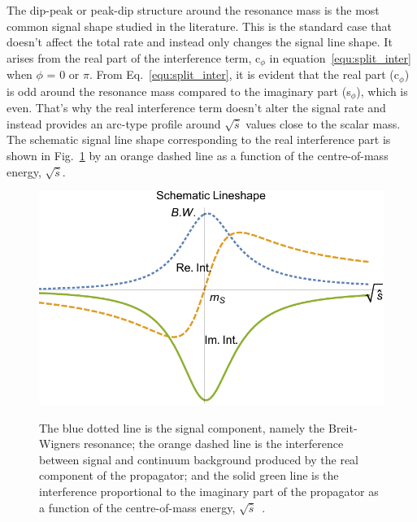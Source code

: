 The dip-peak or peak-dip structure around the resonance mass is the most common signal shape studied in the literature. This is the standard case that doesn't affect the total rate and instead only changes the signal line shape. It arises from the real part of the interference term, c$_{\phi}$ in equation~\ref{equ:split_inter} when $\phi$ = 0 or $\pi$. From Eq.~\ref{equ:split_inter}, it is evident that the real part (c$_{\phi}$) is odd around the resonance mass compared to the imaginary part (s$_{\phi}$), which is even. That's why the real interference term doesn't alter the signal rate and instead provides an arc-type profile around $\sqrt{\hat{s}}$ values close to the scalar mass. The schematic signal line shape corresponding to the real interference part is shown in Fig.~\ref{fig:schematic_lineshape} by an orange dashed line as a function of the centre-of-mass energy, $\sqrt{\hat{s}}$.  
\begin{figure}[htp]
\centering
\includegraphics[trim={0cm 0.0cm 0 0.5cm},clip, scale=0.7]{fig/sm_beyond/schematic_lineshape.pdf}\\
\caption{The blue dotted line is the signal component, namely the Breit-Wigners resonance; the orange dashed line is the interference between signal and continuum background produced by the real component of the propagator; and the solid green line is the interference proportional to the imaginary part of the propagator as a function of the centre-of-mass energy, $\sqrt{\hat{s}}$~\cite{Carena:2016npr}. }\label{fig:schematic_lineshape}
\end{figure}

